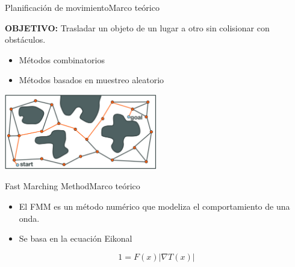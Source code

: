 \documentclass[10pt]{beamer}
\begin{document}
\begin{frame}{Planificación de movimiento}{Marco teórico}\addtocounter{framenumber}{-1}
	\vspace{1.5cm}
	\textbf{OBJETIVO:} Trasladar un objeto de un lugar a otro sin colisionar con obstáculos.
	
	\begin{itemize}
		\item Métodos combinatorios		
		\item Métodos basados en muestreo aleatorio		
	\end{itemize}		
	\begin{center}
		\includegraphics[width=0.5\textwidth,keepaspectratio]{prm_3}
	\end{center}
	
\end{frame}

\begin{frame}{Fast Marching Method}{Marco teórico}
\begin{itemize}
	\item El FMM es un método numérico que modeliza el comportamiento de una onda.
	\item Se basa en la ecuación Eikonal
\end{itemize}

	\begin{equation}
	1=F(x)\left| \nabla T(x) \right| 
	\end{equation}
	
\end{frame}
\end{document}
